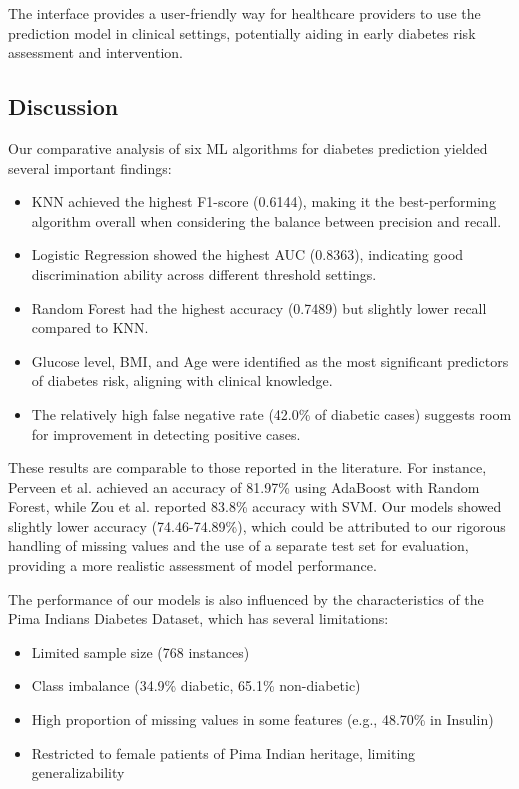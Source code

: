 \documentclass[conference]{IEEEtran}
\begin{document}
The interface provides a user-friendly way for healthcare providers to use the prediction model in clinical settings, potentially aiding in early diabetes risk assessment and intervention.

\subsection{Discussion}
Our comparative analysis of six ML algorithms for diabetes prediction yielded several important findings:

\begin{itemize}
    \item KNN achieved the highest F1-score (0.6144), making it the best-performing algorithm overall when considering the balance between precision and recall.
    \item Logistic Regression showed the highest AUC (0.8363), indicating good discrimination ability across different threshold settings.
    \item Random Forest had the highest accuracy (0.7489) but slightly lower recall compared to KNN.
    \item Glucose level, BMI, and Age were identified as the most significant predictors of diabetes risk, aligning with clinical knowledge.
    \item The relatively high false negative rate (42.0\% of diabetic cases) suggests room for improvement in detecting positive cases.
\end{itemize}

These results are comparable to those reported in the literature. For instance, Perveen et al. \cite{perveen2016} achieved an accuracy of 81.97\% using AdaBoost with Random Forest, while Zou et al. \cite{zou2018} reported 83.8\% accuracy with SVM. Our models showed slightly lower accuracy (74.46-74.89\%), which could be attributed to our rigorous handling of missing values and the use of a separate test set for evaluation, providing a more realistic assessment of model performance.

The performance of our models is also influenced by the characteristics of the Pima Indians Diabetes Dataset, which has several limitations:

\begin{itemize}
    \item Limited sample size (768 instances)
    \item Class imbalance (34.9\% diabetic, 65.1\% non-diabetic)
    \item High proportion of missing values in some features (e.g., 48.70\% in Insulin)
    \item Restricted to female patients of Pima Indian heritage, limiting generalizability
\end{itemize}
\end{document}
